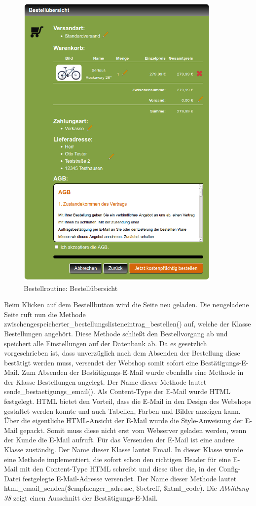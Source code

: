\begin{figure}[H]
	\begin{center}
			\includegraphics[width=100mm]{Bilder/bestelluebersicht.png}
	\end{center}
	\caption{Bestellroutine: Bestellübersicht}
\end{figure}

Beim Klicken auf dem  Bestellbutton wird die Seite neu geladen. Die neugeladene Seite ruft nun die Methode \glqq zwischengespeicherter\_bestellungslisteneintrag\_bestellen()\grqq{} auf, welche der Klasse \glqq Bestellungen\grqq{} angehört. Diese Methode schließt den Bestellvorgang ab und speichert alle Einstellungen auf der Datenbank ab. Da es gesetzlich vorgeschrieben ist, dass unverzüglich nach dem Absenden der Bestellung diese bestätigt werden muss, versendet der Webshop somit sofort eine Bestätigungs-E-Mail. Zum Absenden der Bestätigungs-E-Mail wurde ebenfalls eine Methode in der Klasse \glqq Bestellungen\grqq{} angelegt. Der Name dieser Methode lautet \glqq sende\_bestaetigungs\_email()\grqq{}. Als Content-Type der E-Mail wurde HTML festgelegt. HTML bietet den Vorteil, dass die E-Mail in den Design des Webshops gestaltet werden konnte und auch Tabellen, Farben und Bilder anzeigen kann. Über die eigentliche HTML-Ansicht der E-Mail wurde die Style-Anweisung der E-Mail gepackt. Somit muss diese nicht erst vom Webserver geladen werden, wenn der Kunde die E-Mail aufruft. Für das Versenden der E-Mail ist eine andere Klasse zuständig. Der Name dieser Klasse lautet \glqq Email\grqq{}. In dieser Klasse wurde eine Methode implementiert, die sofort schon den richtigen Header für eine E-Mail mit den Content-Type \glqq HTML\grqq{} schreibt und diese über die, in der \glqq Config-Datei\grqq{} festgelegte E-Mail-Adresse versendet. Der Name dieser Methode lautet \glqq html\_email\_senden(\$empfaenger\_adresse, \$betreff, \$html\_code)\grqq{}. Die \textit{Abbildung 38} zeigt einen Ausschnitt der Bestätigungs-E-Mail.

